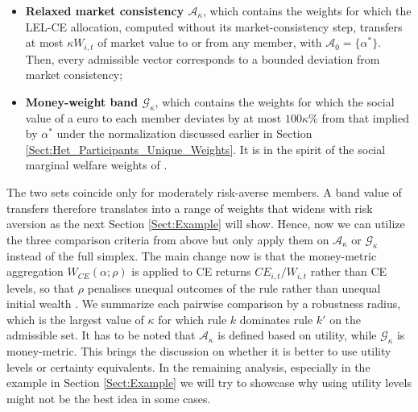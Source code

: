 \begin{itemize}
    \item \textbf{Relaxed market consistency $\mathcal{A}_{\kappa}$}, which contains the weights for which the LEL-CE allocation, computed without its market-consistency step, transfers at most $\kappa W_{i,t}$ of market value to or from any member, with $\mathcal{A}_0 = \{\alpha^*\}$. Then, every admissible vector corresponds to a bounded deviation from market consistency;
    \item \textbf{Money-weight band $\mathcal{G}_{\kappa}$}, which contains the weights for which the social value of a euro to each member deviates by at most $100\kappa\%$ from that implied by $\alpha^*$ under the normalization discussed earlier in Section \ref{Sect:Het_Participants_Unique_Weights}. It is in the spirit of the social marginal welfare weights of \citet{SaezStantcheva2016}.
\end{itemize}
The two sets coincide only for moderately risk-averse members. A band value of transfers therefore translates into a range of weights that widens with risk aversion as the next Section \ref{Sect:Example} will show. Hence, now we can utilize the three comparison criteria from above but only apply them on $\mathcal{A}_{\kappa}$ or $\mathcal{G}_{\kappa}$ instead of the full simplex. The main change now is that the money-metric aggregation $W_{CE}(\alpha;\rho)$ is applied to CE returns $CE_{i,t}/W_{i,t}$ rather than CE levels, so that $\rho$ penalises unequal outcomes of the rule rather than unequal initial wealth \citep{Atkinson_1970}. We summarize each pairwise comparison by a robustness radius, which is the largest value of $\kappa$ for which rule $k$ dominates rule $k'$ on the admissible set. It has to be noted that $\mathcal{A}_{\kappa}$ is defined based on utility, while $\mathcal{G}_{\kappa}$ is money-metric. This brings the discussion on whether it is better to use utility levels or certainty equivalents. In the remaining analysis, especially in the example in Section \ref{Sect:Example} we will try to showcase why using utility levels might not be the best idea in some cases.
